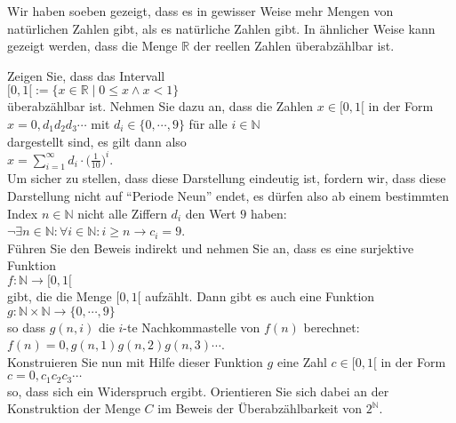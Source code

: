 \remark
Wir haben soeben gezeigt, dass es in gewisser Weise mehr Mengen von natürlichen Zahlen gibt, als es
natürliche Zahlen gibt.  In ähnlicher Weise kann gezeigt werden, dass die Menge $\mathbb{R}$ der reellen
Zahlen überabzählbar ist.  

\exercise
Zeigen Sie, dass das Intervall
\\[0.2cm]
\hspace*{1.3cm}
$[0,1[ := \{ x \in \mathbb{R} \mid 0 \leq x \wedge x < 1 \}$ 
\\[0.2cm]
überabzählbar ist.  Nehmen Sie dazu an, dass die Zahlen $x \in [0,1[$ in der Form
\\[0.2cm]
\hspace*{1.3cm}
$ x = 0, d_1 d_2 d_3 \cdots$ \quad mit $d_i \in \{ 0, \cdots, 9 \}$  für alle $i \in \mathbb{N}$
\\[0.2cm]
dargestellt sind, es gilt dann also
\\[0.2cm]
\hspace*{1.3cm}
$x = \sum\limits_{i=1}^\infty d_i \cdot \bigl(\frac{1}{10}\bigr)^{i}$.
\\[0.2cm]
Um sicher zu stellen, dass diese Darstellung eindeutig ist, fordern wir, dass diese Darstellung
nicht auf ``Periode Neun'' endet, es dürfen also ab einem bestimmten Index $n \in \mathbb{N}$ nicht
alle Ziffern $d_i$ den Wert $9$ haben:
\\[0.2cm]
\hspace*{1.3cm}
$\neg \exists n \in \mathbb{N}: \forall i \in \mathbb{N}: i \geq n \rightarrow c_i = 9$.
\\[0.2cm]
Führen Sie den Beweis indirekt und nehmen Sie an, dass es eine surjektive Funktion 
\\[0.2cm]
\hspace*{1.3cm}
$f: \mathbb{N} \rightarrow [0,1[$
\\[0.2cm]
gibt, die die Menge $[0,1[$ aufzählt.  Dann gibt es auch eine Funktion
\\[0.2cm]
\hspace*{1.3cm}
$g: \mathbb{N} \times \mathbb{N} \rightarrow \{0, \cdots, 9\}$
\\[0.2cm]
so dass $g(n,i)$ die $i$-te Nachkommastelle von $f(n)$ berechnet:
\\[0.2cm]
\hspace*{1.3cm}
$f(n) = 0,g(n,1) g(n,2) g(n,3) \cdots$.
\\[0.2cm]
Konstruieren Sie nun mit Hilfe dieser Funktion $g$ eine Zahl $c \in [0,1[$ in der Form
\\[0.2cm]
\hspace*{1.3cm}
$c = 0,c_1c_2c_3 \cdots$
\\[0.2cm]
so, dass sich ein Widerspruch ergibt.  Orientieren Sie sich dabei an der Konstruktion der Menge $C$ im
Beweis der Überabzählbarkeit von $2^\mathbb{N}$.  \exend


